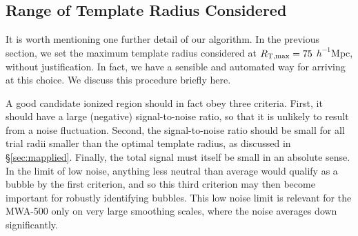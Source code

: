 \subsection{Range of Template Radius Considered} \label{sec:VaryRt}

It is worth mentioning one further detail of our algorithm. In
the previous section, we set the maximum template radius considered at
$R_{\rm T, max} = 75$ $h^{-1}$Mpc, without justification. In fact, we
have a sensible and automated way for arriving at this choice. We discuss this procedure briefly here.
 
A good candidate ionized region should in fact obey three criteria. First,
it should have a large (negative) signal-to-noise ratio, so that it is unlikely
to result from a noise fluctuation. Second, the signal-to-noise ratio should
be small for all trial radii smaller than the optimal template radius, as discussed
in \S \ref{sec:mapplied}. Finally,
the total signal must itself be
small in an absolute sense. In the limit of low noise, anything less neutral 
than average would qualify as a bubble by the first criterion, and so
this third criterion may then become important for robustly identifying bubbles.
This low noise limit is relevant for the MWA-500 only on very large
smoothing scales, where the noise averages down significantly. 

